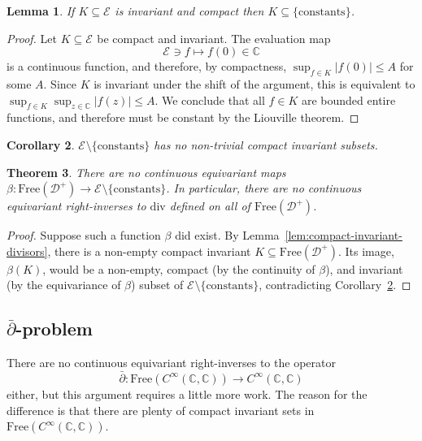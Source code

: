 \documentclass[12pt]{paper}
\numberwithin{equation}{section}
\theoremstyle{plain}
\newtheorem{theorem}{Theorem}[section]
\newtheorem{corollary}[theorem]{Corollary}
\newtheorem{lemma}[theorem]{Lemma}
\theoremstyle{definition}
\newcommand{\C}{\mathbb{C}}
\newcommand{\holom}[1][]{\mathcal{E}_{#1}}
\newcommand{\divis}[1][]{\mathcal{D}_{#1}}
\newcommand{\divisp}[1][]{\divis[#1]^{+}}
\newcommand{\dm}{\mathrm{div}}      %
\newcommand{\free}{\mathrm{Free}}
\begin{document}
\begin{lemma}
  \label{lem:compact-invariant-entire-const}
  If \(K \subseteq \holom\) is invariant and compact then \(K \subseteq \{\textrm{constants}\}\).
\end{lemma}

\begin{proof}[Proof]
  Let \( K \subseteq \holom\) be compact and invariant. The evaluation map
  \[
    \holom \ni f \mapsto f(0) \in \C
  \]
  is a continuous function, and therefore, by compactness, \(\sup_{f \in K}|f(0)| \le A\) for some
  \(A\).  Since \(K\) is invariant under the shift of the argument, this is equivalent to
  \(\sup_{f \in K} \sup_{z \in \C} |f(z)| \le A\).  We conclude that all \(f \in K\) are bounded
  entire functions, and therefore must be constant by the Liouville theorem.
\end{proof}

\begin{corollary}
  \label{cor:no-compact-invariant-entire}
  \(\holom \setminus \{\textrm{constants}\}\) has no non-trivial compact invariant subsets.
\end{corollary}

\begin{theorem}
  \label{thm:no-continuous-equivariant}
  There are no continuous equivariant maps
  \(\beta : \free(\divisp) \to \holom \setminus \{\textrm{constants}\}\).  In particular, there are
  no continuous equivariant right-inverses to \(\dm\) defined on all of \(\free(\divisp)\).
\end{theorem}

\begin{proof}
  Suppose such a function \(\beta\) did exist. By Lemma~\ref{lem:compact-invariant-divisors}, there
  is a non-empty compact invariant \(K \subseteq \free(\divisp)\).  Its image, \(\beta(K)\), would
  be a non-empty, compact (by the continuity of \(\beta\)), and invariant (by the equivariance of
  \(\beta\)) subset of \(\holom \setminus \{\textrm{constants}\}\), contradicting
  Corollary~\ref{cor:no-compact-invariant-entire}.
\end{proof}

\subsection[\texorpdfstring{\(\bar\partial\)}{d-bar}-problem]
{\texorpdfstring{\(\bar{\partial}\)-problem}{d-bar problem}}
\label{sec:d-bar-problem-continuous}
There are no continuous equivariant right-inverses to the operator
\[
\bar{\partial} : \free(C^{\infty}(\C, \C)) \to C^{\infty}(\C, \C)
\]
either, but this argument requires a little more work.
The reason for the difference is that there are plenty of compact
invariant sets in \(\free(C^\infty(\C,\C))\).
\end{document}
